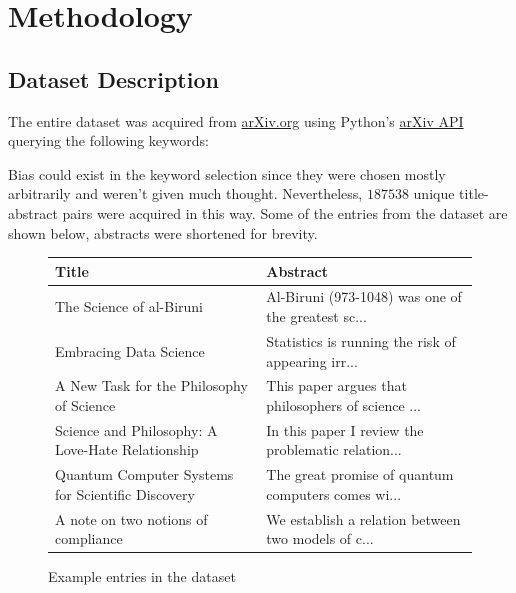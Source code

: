 \documentclass{article}
\begin{document}
\section{Methodology}

\subsection{Dataset Description}

The entire dataset was acquired from \href{https://www.arxiv.org}{arXiv.org} using Python's \href{https://pypi.org/project/arxiv/}{arXiv API} querying the following keywords:
\begin{center}
\end{center}

\noindent Bias could exist in the keyword selection since they were chosen mostly arbitrarily and weren't given much thought. Nevertheless, $187538$ unique title-abstract pairs were acquired in this way. Some of the entries from the dataset are shown below, abstracts were shortened for brevity.

\begin{figure}[H]
    \centering
    \begin{tabular}{l|l}
        \toprule
            Title &                                           Abstract \\
        \hline
        \midrule
        The Science of al-Biruni & Al-Biruni (973-1048) was one of the greatest sc... \\
        Embracing Data Science & Statistics is running the risk of appearing irr... \\
        A New Task for the Philosophy of Science & This paper argues that philosophers of science ... \\
        Science and Philosophy: A Love-Hate Relationship & In this paper I review the problematic relation... \\
        Quantum Computer Systems for Scientific Discovery & The great promise of quantum computers comes wi... \\
        A note on two notions of compliance & We establish a relation between two models of c... \\
        \bottomrule
    \end{tabular}
    \caption{Example entries in the dataset}
    \label{fig:entries_data}
\end{figure}
\end{document}
